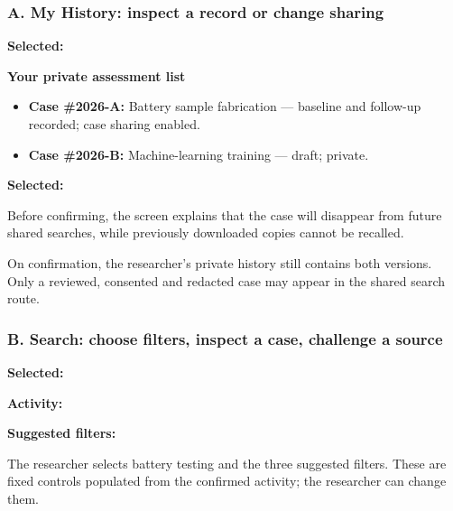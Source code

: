\documentclass[11pt,a4paper]{article}
\begin{document}
\subsubsection*{A. My History: inspect a record or change sharing}
\begin{queryscreen}
\textbf{Selected:} \par
\textbf{Your private assessment list}\par
\begin{itemize}[nosep,leftmargin=1.5em]
  \item \textbf{Case \#2026-A:} Battery sample fabrication --- baseline and follow-up recorded; case sharing enabled.
  \item \textbf{Case \#2026-B:} Machine-learning training --- draft; private.
\end{itemize}
\quad
{}\quad
{}\quad
{}
\end{queryscreen}

\begin{queryscreen}
\textbf{Selected:} \par
Before confirming, the screen explains that the case will disappear from future shared searches, while previously downloaded copies cannot be recalled.\par\medskip
{}\quad
{}\par\medskip
On confirmation, the researcher's private history still contains both versions. Only a reviewed, consented and redacted case may appear in the shared search route.
\end{queryscreen}

\subsubsection*{B. Search: choose filters, inspect a case, challenge a source}
\begin{queryscreen}
\textbf{Selected:} \par
\textbf{Activity:} \quad
{}\quad
{}\par
\textbf{Suggested filters:} \quad
{}\quad
{}\par\medskip
The researcher selects battery testing and the three suggested filters. These are fixed controls populated from the confirmed activity; the researcher can change them.
\end{queryscreen}
\end{document}
